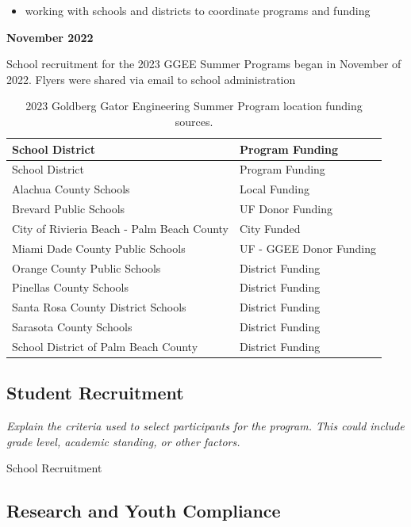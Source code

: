 \documentclass[
]{article}
\providecommand{\tightlist}{%
  \setlength{\itemsep}{0pt}\setlength{\parskip}{0pt}}
\begin{document}
\begin{itemize}
\tightlist
\item
  working with schools and districts to coordinate programs and funding
\end{itemize}

\textbf{November 2022}

School recruitment for the 2023 GGEE Summer Programs began in November
of 2022. Flyers were shared via email to school administration

\begin{longtable}[]{@{}ll@{}}
\caption{2023 Goldberg Gator Engineering Summer Program location funding
sources.}\tabularnewline
\toprule\noalign{}
School District & Program Funding \\
\midrule\noalign{}
\endfirsthead
\toprule\noalign{}
School District & Program Funding \\
\midrule\noalign{}
\endhead
\bottomrule\noalign{}
\endlastfoot
Alachua County Schools & Local Funding \\
Brevard Public Schools & UF Donor Funding \\
City of Rivieria Beach - Palm Beach County & City Funded \\
Miami Dade County Public Schools & UF - GGEE Donor Funding \\
Orange County Public Schools & District Funding \\
Pinellas County Schools & District Funding \\
Santa Rosa County District Schools & District Funding \\
Sarasota County Schools & District Funding \\
School District of Palm Beach County & District Funding \\
\end{longtable}

\hypertarget{student-recruitment}{%
\subsection{Student Recruitment}\label{student-recruitment}}

\emph{Explain the criteria used to select participants for the program.
This could include grade level, academic standing, or other factors.}

School Recruitment

\hypertarget{research-and-youth-compliance}{%
\subsection{Research and Youth
Compliance}\label{research-and-youth-compliance}}
\end{document}
